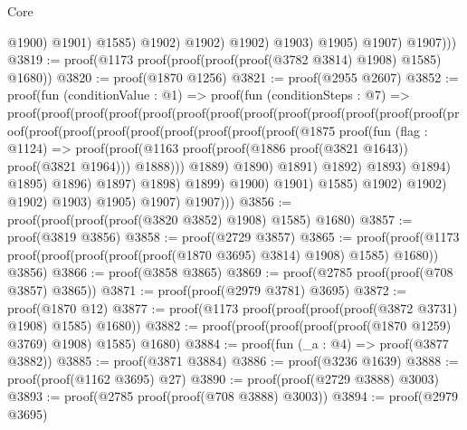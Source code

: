 \begin{lexlean}{Core}
\begin{coremodule}
                            @1900)
                          @1901)
                        @1585)
                      @1902)
                    @1902)
                  @1902)
                @1903)
              @1905)
            @1907)
          @1907)))
@3819 := proof(@1173 proof(proof(proof(proof(@3782 @3814) @1908) @1585) @1680))
@3820 := proof(@1870 @1256)
@3821 := proof(@2955 @2607)
@3852 := proof(fun (conditionValue : @1) =>
    proof(fun (conditionSteps : @7) =>
      proof(proof(proof(proof(proof(proof(proof(proof(proof(proof(proof(proof(proof(proof(proof(proof(proof(proof(proof(proof(proof(proof(@1875
                                                    proof(fun (flag : @1124) =>
                                                      proof(proof(@1163
                                                            proof(proof(@1886 proof(@3821 @1643))
                                                                proof(@3821 @1964)))
                                                          @1888)))
                                                  @1889)
                                                @1890)
                                              @1891)
                                            @1892)
                                          @1893)
                                        @1894)
                                      @1895)
                                    @1896)
                                  @1897)
                                @1898)
                              @1899)
                            @1900)
                          @1901)
                        @1585)
                      @1902)
                    @1902)
                  @1902)
                @1903)
              @1905)
            @1907)
          @1907)))
@3856 := proof(proof(proof(proof(@3820 @3852) @1908) @1585) @1680)
@3857 := proof(@3819 @3856)
@3858 := proof(@2729 @3857)
@3865 := proof(proof(@1173 proof(proof(proof(proof(proof(@1870 @3695) @3814) @1908) @1585) @1680))
      @3856)
@3866 := proof(@3858 @3865)
@3869 := proof(@2785 proof(proof(@708 @3857) @3865))
@3871 := proof(proof(@2979 @3781) @3695)
@3872 := proof(@1870 @12)
@3877 := proof(@1173 proof(proof(proof(proof(@3872 @3731) @1908) @1585) @1680))
@3882 := proof(proof(proof(proof(proof(@1870 @1259) @3769) @1908) @1585) @1680)
@3884 := proof(fun (_a : @4) => proof(@3877 @3882))
@3885 := proof(@3871 @3884)
@3886 := proof(@3236 @1639)
@3888 := proof(proof(@1162 @3695) @27)
@3890 := proof(proof(@2729 @3888) @3003)
@3893 := proof(@2785 proof(proof(@708 @3888) @3003))
@3894 := proof(@2979 @3695)

\end{coremodule}
\end{lexlean}
